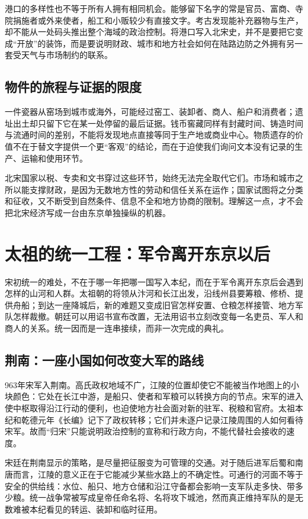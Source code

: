 港口的多样性也不等于所有人拥有相同机会。能够留下名字的常是官员、富商、寺院捐施者或外来使者，船工和小贩较少有直接文字。考古发现能补充器物与生产，却不能从一处码头推出整个海域的政治控制。将港口写入北宋史，并不是要把它变成“开放”的装饰，而是要说明财政、城市和地方社会如何在陆路边防之外拥有另一套受天气与市场制约的联系。

\subsection{物件的旅程与证据的限度}

一件瓷器从窑场到城市或海外，可能经过窑工、装卸者、商人、船户和消费者；遗址出土却只留下它在某一处停留的最后证据。钱币窖藏同样有封藏时间、铸造时间与流通时间的差别，不能将发现地点直接等同于生产地或商业中心。物质遗存的价值不在于替文字提供一个更“客观”的结论，而在于迫使我们询问文本没有记录的生产、运输和使用环节。

北宋国家以税、专卖和文书穿过这些环节，始终无法完全取代它们。市场和城市之所以能支撑财政，是因为无数地方性的劳动和信任关系在运作；国家试图将之分类和征收，又不断受到自然条件、信息不全和地方协商的限制。理解这一点，才不会把北宋经济写成一台由东京单独操纵的机器。

\section{太祖的统一工程：军令离开东京以后}

宋初统一的难处，不在于哪一年把哪一国写入本纪，而在于军令离开东京后会遇到怎样的山河和人群。太祖朝的将领从汴河和长江出发，沿线州县要筹粮、修桥、提供舟船；到达一座降城后，新的难题又变成旧官怎样安置、仓粮怎样接管、地方军队怎样裁撤。朝廷可以用诏书宣布改置，无法用诏书立刻改变每一名吏员、军人和商人的关系。统一因而是一连串接续，而非一次完成的典礼。

\subsection{荆南：一座小国如何改变大军的路线}

963年宋军入荆南。高氏政权地域不广，江陵的位置却使它不能被当作地图上的小块颜色：它处在长江中游，是船只、使者和军粮可以转换方向的节点。宋军的进入使中枢取得沿江行动的便利，也迫使地方社会面对新的驻军、税粮和官府。太祖本纪和乾德元年《长编》记下了政权转移；它们并未逐户记录江陵周围的人如何看待宋军。故而“归宋”只能说明政治控制的宣称和行政方向，不能代替社会接收的速度。

宋廷在荆南显示的策略，是尽量把征服变为可管理的交通。对于随后进军后蜀和南唐而言，江陵的意义正在于它能减少某些水路上的不确定性。可通行的河面不等于安全的供给线：水位、船只、地方仓储和沿江守备都会影响一支军队走多快、带多少粮。统一战争常被写成皇帝任命名将、名将攻下城池，然而真正维持军队的是无数难被本纪看见的转运、装卸和临时征用。

